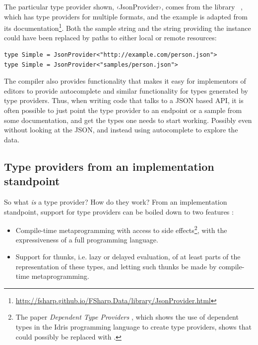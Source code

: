 The particular type provider shown, ‹JsonProvider›, comes from the library \fsharpdata\ \cite{fsharpdata}, which has type providers for multiple formats, and the example is adapted from its documentation\footnote{\url{http://fsharp.github.io/FSharp.Data/library/JsonProvider.html}}. Both the sample string and the string providing the instance could have been replaced by paths to either local or remote resources:

\begin{verbatim}
type Simple = JsonProvider<"http://example.com/person.json">
type Simple = JsonProvider<"samples/person.json">
\end{verbatim}

The compiler also provides functionality that makes it easy for implementors of editors to provide autocomplete and similar functionality for types generated by type providers. Thus, when writing code that talks to a JSON based API, it is often possible to just point the type provider to an endpoint or a sample from some documentation, and get the types one needs to start working. Possibly even without looking at the JSON, and instead using autocomplete to explore the data.

\subsection{Type providers from an implementation standpoint}

So what \emph{is} a type provider? How do they work? From an implementation standpoint, support for type providers can be boiled down to two features \cite{fsharp-themes-info-rich}:

\begin{itemize}
  \item Compile-time metaprogramming with access to side effects\footnote{The paper \emph{Dependent Type Providers} \cite{dependent-type-providers}, which shows the use of dependent types in the Idris programming language to create type providers, shows that  could possibly be replaced with .}, with the expressiveness of a full programming language.
  \item Support for thunks, i.e. lazy or delayed evaluation, of at least parts of the representation of these types, and letting such thunks be made by compile-time metaprogramming.
\end{itemize}

